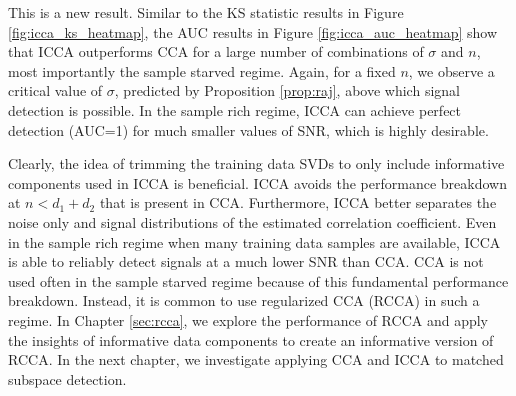 This is a new result. Similar to the KS statistic results in Figure
\ref{fig:icca_ks_heatmap}, the AUC results in Figure \ref{fig:icca_auc_heatmap} show that
ICCA outperforms CCA for a large number of combinations of $\sigma$ and $n$, most
importantly the sample starved regime. Again, for a fixed $n$, we observe a critical value
of $\sigma$, predicted by Proposition \ref{prop:raj}, above which signal detection is
possible. In the sample rich regime, ICCA can achieve perfect detection (AUC=1) for much
smaller values of SNR, which is highly desirable.

Clearly, the idea of trimming the training data SVDs to only include informative
components used in ICCA is beneficial. ICCA avoids the performance breakdown at
$n<d_1+d_2$ that is present in CCA. Furthermore, ICCA better separates the noise only and
signal distributions of the estimated correlation coefficient. Even in the sample rich
regime when many training data samples are available, ICCA is able to reliably detect
signals at a much lower SNR than CCA. CCA is not used often in the sample starved regime
because of this fundamental performance breakdown. Instead, it is common to use
regularized CCA (RCCA) in such a regime. In Chapter \ref{sec:rcca}, we explore the
performance of RCCA and apply the insights of informative data components to create an
informative version of RCCA. In the next chapter, we investigate applying CCA and ICCA to
matched subspace detection.
